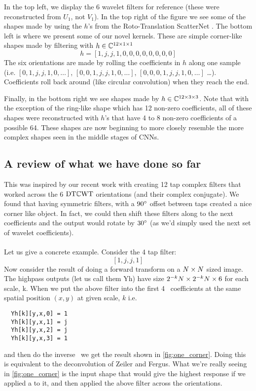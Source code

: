 In the top left, we display the 6 wavelet filters for reference (these were
reconstructed from $U_1$, not $V_1$). In the top right of the figure we see some
of the shapes made by using the $h$'s from the Roto-Translation ScatterNet
\cite{sifre_rotation_2013, oyallon_deep_2015}.  The bottom left is where we
present some of our novel kernels. These are simple corner-like shapes made 
by filtering with ${h\in \complexes[12\x 1\x 1]}$
\begin{equation} \label{eq:ch4:simple_corner}
  h = [1, j, j, 1, 0, 0, 0, 0, 0, 0, 0, 0]
\end{equation}
The six orientations are made by rolling the coefficients in $h$ along one
sample (i.e. $[0, 1, j, j, 1, 0,\ldots]$, $[0,0,1,j,j,1,0,\ldots]$,
$[0,0,0,1,j,j,1,0, \ldots]$ \ldots). Coefficients roll back around (like
circular convolution) when they reach the end.

Finally, in the bottom right we see shapes made by 
${h \in \complexes[12\x 3\x 3]}$. Note that with the exception of the 
ring-like shape which has 12 non-zero coefficients, all of these shapes were
reconstructed with $h$'s that have 4 to 8 non-zero coefficients of a possible 
64. These shapes are now beginning to more closely resemble the more complex
shapes seen in the middle stages of CNNs. 

\subsection{A review of what we have done so far}
This was inspired by our recent work with creating 12 tap complex filters
that worked across the 6 $\DTCWT$ orientations (and their complex conjugate).
We found that having symmetric filters, with a $90\degs$ offset between
taps created a nice corner like object. In fact, we could then shift these
filters along to the next coefficients and the output would rotate by
$30\degs$ (as we'd simply used the next set of wavelet coefficients).\\\\
Let us give a concrete example. Consider the 4 tap filter:
$$\left[1, j, j, 1\right]$$
Now consider the result of doing a forward transform on a $N\x N$ sized
image. The highpass outputs (let us call them Yh) have size $2^{-k}N \x 2^{-k}N \x 6$ for each
scale, k.
When we  put the above filter into the first 4 \DTCWT\ coefficients at
the same spatial position $(x,y)$ at given scale, $k$ i.e.\
  \begin{lstlisting}
  Yh[k][y,x,0] = 1
  Yh[k][y,x,1] = j
  Yh[k][y,x,2] = j
  Yh[k][y,x,3] = 1
  \end{lstlisting}
and then do the inverse \DTCWT\, we get the result shown in
\autoref{fig:one_corner}. Doing this is equivalent to the deconvolution of
Zeiler and Fergus. What we're really seeing in \autoref{fig:one_corner} is
the input shape that would give the highest response if we applied a \DTCWT
to it, and then applied the above filter across the orientations.

